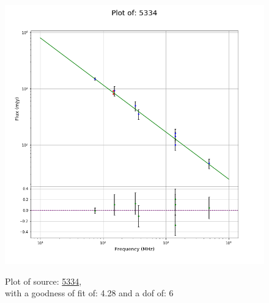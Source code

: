 \documentclass{article}
\begin{document}
\begin{figure}[H]
    \centering
    \begin{minipage}{.5\textwidth}
        \centering
        \includegraphics[scale = 0.35]{KmeulenSimSource_1hr/1hr5334.png}
        \captionsetup{labelformat=empty}
        \caption{Plot of source: \href{http://banana.transientskp.org/r4/vlo_KmeulenSimSource/runningcatalog/5334}{5334},\\with a goodness of fit of: 4.28 and a dof of: 6}
        \addtocounter{figure}{-1}
        \label{KmeulenSimSource:1hr:5334:plot}
    \end{minipage}%
    \begin{minipage}{0.5\textwidth}
        \centering


\end{minipage}
\end{figure}
\end{document}
